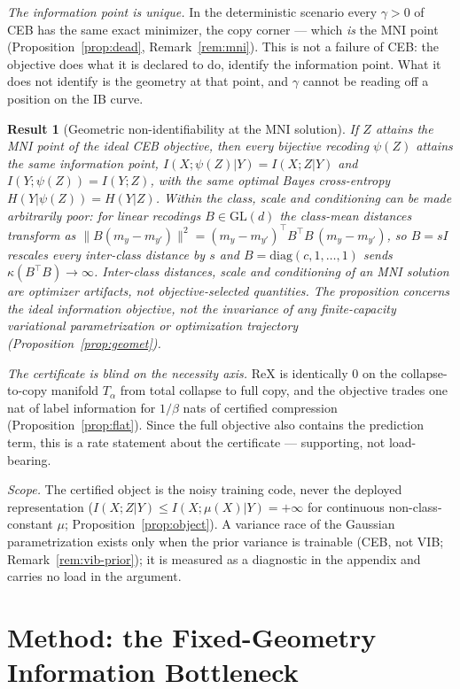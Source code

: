 \documentclass{article} %
\newtheorem{result}{Result}   %
\newcommand{\ReX}{\mathrm{ReX}}
\begin{document}
\emph{The information point is unique.} In the deterministic scenario every $\gamma>0$
of CEB has the same exact minimizer, the copy corner --- which \emph{is} the MNI point
(Proposition~\ref{prop:dead}, Remark~\ref{rem:mni}). This is not a failure of CEB: the
objective does what it is declared to do, identify the information point. What it does
not identify is the geometry at that point, and $\gamma$ cannot be reading off a
position on the IB curve.

\begin{result}[Geometric non-identifiability at the MNI solution]\label{res:geomet}
If $Z$ attains the MNI point of the \emph{ideal} CEB objective, then every bijective
recoding $\psi(Z)$ attains the same information point, $I(X;\psi(Z)|Y) = I(X;Z|Y)$ and
$I(Y;\psi(Z)) = I(Y;Z)$, with the same optimal Bayes cross-entropy $H(Y|\psi(Z)) =
H(Y|Z)$. Within the class, scale and conditioning can be made \emph{arbitrarily poor}:
for linear recodings $B \in \mathrm{GL}(d)$ the class-mean distances transform as
$\|B(m_y-m_{y'})\|^2 = (m_y-m_{y'})^{\top}B^{\top}B\,(m_y-m_{y'})$, so $B = sI$
rescales every inter-class distance by $s$ and $B = \mathrm{diag}(c,1,\dots,1)$ sends
$\kappa(B^{\top}B) \to \infty$. Inter-class distances, scale and conditioning of an MNI
solution are optimizer artifacts, not objective-selected quantities. The proposition
concerns the ideal information objective, not the invariance of any finite-capacity
variational parametrization or optimization trajectory
(Proposition~\ref{prop:geomet}).
\end{result}

\emph{The certificate is blind on the necessity axis.} $\ReX$ is identically $0$ on the
collapse-to-copy manifold $T_\alpha$ from total collapse to full copy, and the objective
trades one nat of label information for $1/\beta$ nats of certified compression
(Proposition~\ref{prop:flat}). Since the full objective also contains the prediction
term, this is a rate statement about the certificate --- supporting, not load-bearing.

\emph{Scope.} The certified object is the noisy training code, never the deployed
representation ($I(X;Z|Y) \le I(X;\mu(X)|Y) = +\infty$ for continuous
non-class-constant $\mu$; Proposition~\ref{prop:object}). A variance race of the
Gaussian parametrization exists only when the prior variance is trainable (CEB, not
VIB; Remark~\ref{rem:vib-prior}); it is measured as a diagnostic in the appendix and
carries no load in the argument.

\section{Method: the Fixed-Geometry Information Bottleneck}
\label{sec:method}
\end{document}
